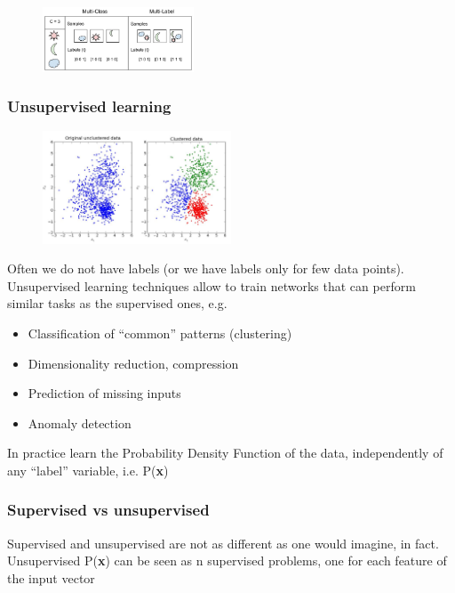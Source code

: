 \begin{figure}[ht]
	\centering
	\includegraphics[width=0.4\textwidth]{figure_ml/multi_class.png}
\end{figure}
\FloatBarrier

\subsubsection{Unsupervised learning}

\begin{figure}
	\includegraphics[width=0.5\textwidth]{figure_ml/unsupervised.png}
\end{figure} 

Often we do not have labels (or we have labels only for few data points). Unsupervised learning techniques allow to train networks that can perform
similar tasks as the supervised ones, e.g.

\begin{itemize}
	\item Classification of “common” patterns (clustering)
	\item Dimensionality reduction, compression
	\item Prediction of missing inputs
	\item Anomaly detection
\end{itemize}



In practice learn the Probability Density Function of the data, independently of any “label” variable, i.e. P(\textbf{x})

\subsubsection{Supervised vs unsupervised}

Supervised and unsupervised are not as different as one would imagine, in fact.\\
Unsupervised P(\textbf{x}) can be seen as n supervised problems, one for each feature of the input vector

